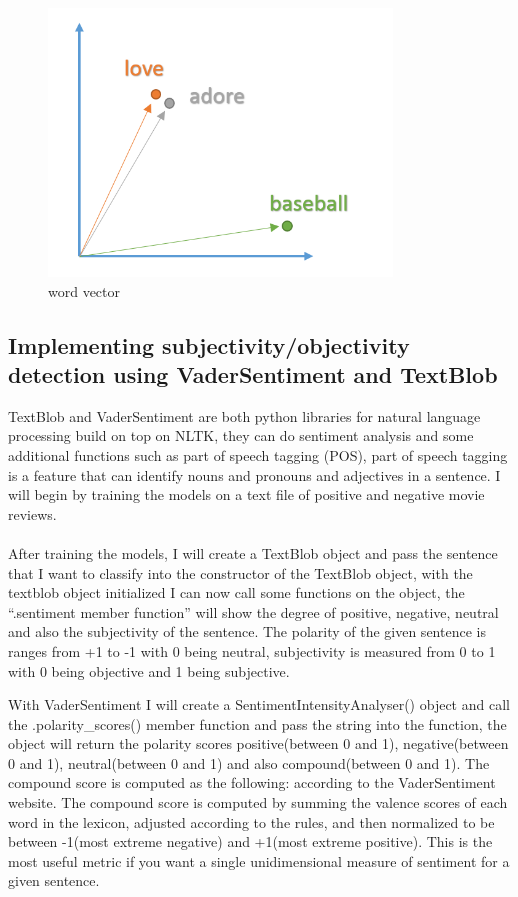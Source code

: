 \begin{figure}[h]
    \centering
    \includegraphics{images/word_vec_1.png}
    \caption{word vector}
\end{figure}



\subsection{Implementing subjectivity/objectivity detection using VaderSentiment and TextBlob}
TextBlob and VaderSentiment are both python libraries for natural language processing build on top on NLTK, they can do sentiment analysis and some additional functions such as part of speech tagging (POS), part of speech tagging is a feature that can identify nouns and pronouns and adjectives in a sentence. I will begin by training the models on a text file of positive and negative movie reviews.\\ \\
After training the models, I will create a TextBlob object and pass the sentence that I want to classify into the constructor of the TextBlob object, with the textblob object initialized I can now call some functions on the object, the “.sentiment member function” will show the degree of positive, negative, neutral and also the subjectivity of the sentence. The polarity of the given sentence is ranges from +1 to -1 with 0 being neutral, subjectivity is measured from 0 to 1 with 0 being objective and 1 being subjective.



With VaderSentiment I will create  a SentimentIntensityAnalyser() object and call the .polarity\_scores() member function and pass the string into the function, the object will return the polarity scores positive(between 0 and 1), negative(between 0 and 1), neutral(between 0 and 1) and also compound(between 0 and 1). The compound score is computed as the following: according to the VaderSentiment website. The compound score is computed by summing the valence scores of each word in the lexicon, adjusted according to the rules, and then normalized to be between -1(most extreme negative) and +1(most extreme positive). This is the most useful metric if you want a single unidimensional measure of sentiment for a given sentence. 


